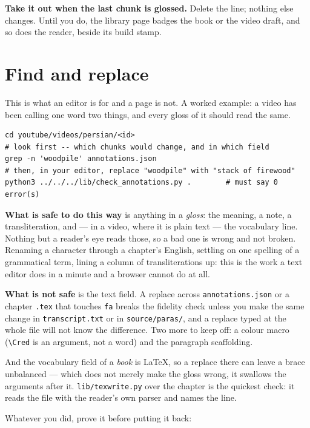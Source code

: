 \documentclass[11pt,oneside]{report}
\newcommand{\file}[1]{\texttt{#1}}
\newcommand{\menu}[1]{\textsf{#1}}
\begin{document}
\textbf{Take it out when the last chunk is glossed.} Delete the line;
nothing else changes. Until you do, the library page badges the book or the
video \menu{draft}, and so does the reader, beside its build stamp.

\section{Find and replace}
\label{sec:sed}

This is what an editor is for and a page is not. A worked example: a video has
been calling one word two things, and every gloss of it should read the same.

\begin{lstlisting}
cd youtube/videos/persian/<id>
# look first -- which chunks would change, and in which field
grep -n 'woodpile' annotations.json
# then, in your editor, replace "woodpile" with "stack of firewood"
python3 ../../../lib/check_annotations.py .        # must say 0 error(s)
\end{lstlisting}

\textbf{What is safe to do this way} is anything in a \emph{gloss}: the
meaning, a note, a transliteration, and --- in a video, where it is plain
text --- the vocabulary line. Nothing but a reader's eye reads those, so a bad
one is wrong and not broken. Renaming a character through a chapter's English,
settling on one spelling of a grammatical term, lining a column of
transliterations up: this is the work a text editor does in a minute and a
browser cannot do at all.

\begin{badbox}
\textbf{What is not safe} is the text field. A replace across
\file{annotations.json} or a chapter \file{.tex} that touches \texttt{fa}
breaks the fidelity check unless you make the same change in
\file{transcript.txt} or in \file{source/paras/}, and a replace typed at the
whole file will not know the difference. Two more to keep off: a colour macro
(\verb|\Cred| is an argument, not a word) and the paragraph scaffolding.

\medskip
And the vocabulary field of a \emph{book} is LaTeX, so a replace there can
leave a brace unbalanced --- which does not merely make the gloss wrong, it
swallows the arguments after it. \file{lib/texwrite.py} over the chapter is
the quickest check: it reads the file with the reader's own parser and names
the line.
\end{badbox}

\noindent Whatever you did, prove it before putting it back:
\end{document}
